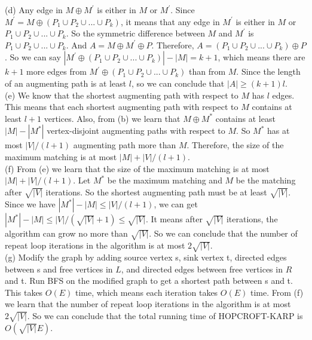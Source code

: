 \documentclass{article}
\begin{document}
(d) Any edge in $M\oplus M^{'}$ is either in $M$ or $M^{'}$. Since $M^{'} = M\oplus (P_1\cup P_2\cup ... \cup P_k)$, it means that any edge in $M^{'}$ is either in $M$ or $P_1\cup P_2\cup ... \cup P_k$. So the symmetric difference between $M$ and $M^{'}$ is $P_1\cup P_2\cup ... \cup P_k$. And $A = M\oplus M^{'}\oplus P$. Therefore, $A = (P_1\cup P_2\cup ... \cup P_k)\oplus P$.  So we can say $|M^{'}\oplus (P_1\cup P_2\cup ... \cup P_k)| - |M| = k + 1$, which means there are $k + 1$ more edges from $M^{'}\oplus (P_1\cup P_2\cup ... \cup P_k)$ than from $M$. Since the length of an augmenting path is at least $l$, so we can conclude that $|A| \geq (k + 1)l$. \\\newline
(e) We know that the shortest augmenting path with respect to $M$ has $l$ edges. This means that each shortest augmenting path with respect to $M$ contains at least $l + 1$ vertices. Also, from (b) we learn that $M\oplus M^{*}$ contains at least $|M| - |M^{*}|$ vertex-disjoint augmenting paths with respect to $M$. So $M^{*}$ has at most $|V|/(l + 1)$ augmenting path more than $M$. Therefore, the size of the maximum matching is at most $|M| + |V|/(l + 1)$.\\ \newline
(f) From (e) we learn that the size of the maximum matching is at most $|M| + |V|/(l + 1)$. Let $M^{*}$ be the maximum matching and $M$ be the matching after $\sqrt{|V|}$ iterations. So the shortest augmenting path must be at least $\sqrt{|V|}$. Since we have $|M^{*}| - |M| \leq |V|/(l + 1)$, we can get $|M^{*}| - |M| \leq |V|/(\sqrt{|V|} + 1) \leq \sqrt{|V|}$. It means after $\sqrt{|V|}$ iterations, the algorithm can grow no more than $\sqrt{|V|}$. So we can conclude that the number of repeat loop iterations in the algorithm is at most $2\sqrt{|V|}$. \\ \newline
(g) Modify the graph by adding source vertex s, sink vertex t, directed edges between s and free vertices in $L$, and directed edges between free vertices in $R$ and t. Run BFS on the modified graph to get a shortest path between s and t. This takes $O(E)$ time, which means each iteration takes $O(E)$ time. From (f) we learn that the number of repeat loop iterations in the algorithm is at most $2\sqrt{|V|}$. So we can conclude that the total running time of HOPCROFT-KARP is $O(\sqrt{|V|}E)$. \\
\end{document}
